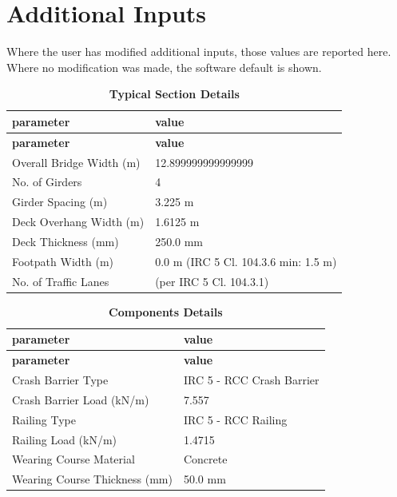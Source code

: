 \documentclass[12pt,a4paper]{report}
\numberwithin{table}{chapter}
\numberwithin{figure}{chapter}
\begin{document}
\newpage
{}
\section{Additional Inputs}
\label{sec:additional-inputs}

Where the user has modified additional inputs, those values are reported here. Where no modification was made, the software default is shown.

\vspace{0.8cm}

\begin{longtable}{|L{5.5cm}|p{10.0cm}|}
\caption{\textbf{Typical Section Details}}
\hline
{} \textbf{parameter} & \textbf{value} \\
\hline
\endfirsthead
\hline
{} \textbf{parameter} & \textbf{value} \\
\hline
\endhead
\textnormal{Overall Bridge Width (m)} & 12.899999999999999 \\[6pt]
\hline
\textnormal{No. of Girders} & 4 \\[6pt]
\hline
\textnormal{Girder Spacing (m)} & 3.225 m \\[6pt]
\hline
\textnormal{Deck Overhang Width (m)} & 1.6125 m \\[6pt]
\hline
\textnormal{Deck Thickness (mm)} & 250.0 mm \\[6pt]
\hline
\textnormal{Footpath Width (m)} & 0.0 m (IRC 5 Cl. 104.3.6 min: 1.5 m) \\[6pt]
\hline
\textnormal{No. of Traffic Lanes} &  (per IRC 5 Cl. 104.3.1) \\[6pt]
\hline
\end{longtable}

\vspace{0.8em}

\begin{longtable}{|L{5.5cm}|p{10.0cm}|}
\caption{\textbf{Components Details}}
\hline
{} \textbf{parameter} & \textbf{value} \\
\hline
\endfirsthead
\hline
{} \textbf{parameter} & \textbf{value} \\
\hline
\endhead
\textnormal{Crash Barrier Type} & IRC 5 - RCC Crash Barrier \\[6pt]
\hline
\textnormal{Crash Barrier Load (kN/m)} & 7.557 \\[6pt]
\hline

\textnormal{Railing Type} & IRC 5 - RCC Railing \\[6pt]
\hline
\textnormal{Railing Load (kN/m)} & 1.4715 \\[6pt]
\hline
\textnormal{Wearing Course Material} & Concrete \\[6pt]
\hline
\textnormal{Wearing Course Thickness (mm)} & 50.0 mm \\[6pt]
\hline
\end{longtable}
\end{document}
